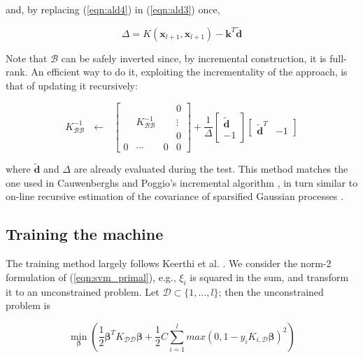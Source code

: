 \documentclass[10pt,twocolumn,letterpaper]{article}
\def\xx{\mathbf{x}}
\def\bb{\mathbf{\beta}}
\def\dd{\mathbf{d}}
\def\mdd{\tilde{\dd}}
\def\b{\mathcal{B}}
\def\d{\mathcal{D}}
\begin{document}
and, by replacing (\ref{eqn:ald4}) in (\ref{eqn:ald3}) once,

\begin{equation} \label{eqn:ald5}
  \Delta = K(\xx_{l+1},\xx_{l+1}) - \mathbf{k}^T \mdd
\end{equation}

Note that $\b$ can be safely inverted since, by incremental
construction, it is full-rank. An efficient way to do it, exploiting
the incrementality of the approach, is that of updating it
recursively:

\begin{equation} \label{eqn:inv_upd}
  K_{\b\b}^{-1} ~~~ \leftarrow ~~~
  \left[\begin{array}{cccc}
       &               &   & 0 \\
       & K_{\b\b}^{-1} &   & \vdots \\
       &               &   & 0 \\
     0 &       \cdots  & 0 & 0
  \end{array}\right]
  +
  \frac{1}{\Delta}
  \left[\begin{array}{c}
    \mdd \\
    -1
  \end{array}\right]
  \left[\begin{array}{cc}
    \mdd^T & -1
  \end{array}\right]
\end{equation}

where $\mdd$ and $\Delta$ are already evaluated during the test. This
method matches the one used in Cauwenberghs and Poggio's incremental
algorithm \cite{CauwenberghsP00}, in turn similar to on-line recursive
estimation of the covariance of sparsified Gaussian processes
\cite{csat'o01sparse}.

\subsection{Training the machine}

The training method largely follows Keerthi et
al. \cite{KeerthiDC05,KeerthiCDC06}. We consider the norm-2
formulation of (\ref{eqn:svm_primal}), e.g., $\xi_i$ is squared in the
sum, and transform it to an unconstrained problem. Let $\d \subset
\{1,\ldots,l\}$; then the unconstrained problem is

\begin{equation} \label{eqn:primal}
  \min_{\bb} \left( 
      \frac{1}{2} \bb^T K_{\d\d} \bb
    + \frac{1}{2} C \sum_{i=1}^l max \left(0,1-y_i K_{i,\d} \bb \right)^2
  \right)
\end{equation}
\end{document}

